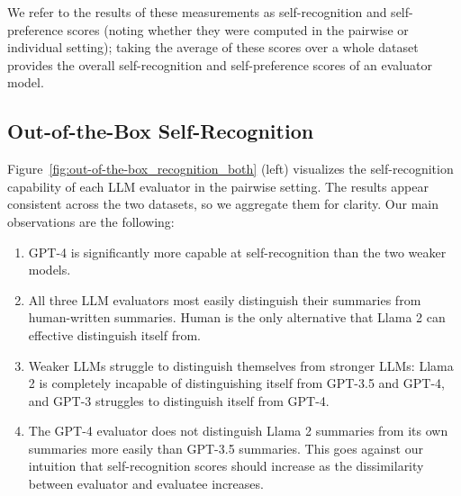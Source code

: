\documentclass{article}
\theoremstyle{plain}
\theoremstyle{definition}
\theoremstyle{remark}
\begin{document}
We refer to the results of these measurements as self-recognition and self-preference scores (noting whether they were computed in the pairwise or individual setting); taking the average of these scores over a whole dataset provides the overall self-recognition and self-preference scores of an evaluator model.

\subsection{Out-of-the-Box Self-Recognition}

Figure~\ref{fig:out-of-the-box_recognition_both} (left) visualizes the self-recognition capability of each LLM evaluator in the pairwise setting.
The results appear consistent across the two datasets, so we aggregate them for clarity.
Our main observations are the following:

\begin{enumerate}
\itemsep0em 
\item GPT-4 is significantly more capable at self-recognition than the two weaker models.
\item All three LLM evaluators most easily distinguish their summaries from human-written summaries. Human is the only alternative that Llama 2 can effective distinguish itself from.
\item Weaker LLMs struggle to distinguish themselves from stronger LLMs: Llama 2 is completely incapable of distinguishing itself from GPT-3.5 and GPT-4, and GPT-3 struggles to distinguish itself from GPT-4.
\item The GPT-4 evaluator does not distinguish Llama 2 summaries from its own summaries more easily than GPT-3.5 summaries. This goes against our intuition that self-recognition scores should increase as the dissimilarity between evaluator and evaluatee increases.

\end{enumerate}
\end{document}
